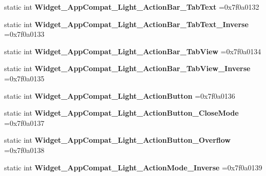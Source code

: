 \begin{DoxyCompactItemize}
static int {\bfseries Widget\+\_\+\+App\+Compat\+\_\+\+Light\+\_\+\+Action\+Bar\+\_\+\+Tab\+Text} =0x7f0a0132
\item 
\mbox{\label{classandroid_1_1support_1_1v4_1_1R_1_1style_aaf4b76b828460b4d14c966f7888f49d9}} 
static int {\bfseries Widget\+\_\+\+App\+Compat\+\_\+\+Light\+\_\+\+Action\+Bar\+\_\+\+Tab\+Text\+\_\+\+Inverse} =0x7f0a0133
\item 
\mbox{\label{classandroid_1_1support_1_1v4_1_1R_1_1style_a7fd9a696ea5c660f4b11408e3d6fc00d}} 
static int {\bfseries Widget\+\_\+\+App\+Compat\+\_\+\+Light\+\_\+\+Action\+Bar\+\_\+\+Tab\+View} =0x7f0a0134
\item 
\mbox{\label{classandroid_1_1support_1_1v4_1_1R_1_1style_aa3b5f71ae63d55d5da8e51136dacdff0}} 
static int {\bfseries Widget\+\_\+\+App\+Compat\+\_\+\+Light\+\_\+\+Action\+Bar\+\_\+\+Tab\+View\+\_\+\+Inverse} =0x7f0a0135
\item 
\mbox{\label{classandroid_1_1support_1_1v4_1_1R_1_1style_a83d68e87499011b6b95af61082e44988}} 
static int {\bfseries Widget\+\_\+\+App\+Compat\+\_\+\+Light\+\_\+\+Action\+Button} =0x7f0a0136
\item 
\mbox{\label{classandroid_1_1support_1_1v4_1_1R_1_1style_a0b990964682b267e3fd91dd641c4aa28}} 
static int {\bfseries Widget\+\_\+\+App\+Compat\+\_\+\+Light\+\_\+\+Action\+Button\+\_\+\+Close\+Mode} =0x7f0a0137
\item 
\mbox{\label{classandroid_1_1support_1_1v4_1_1R_1_1style_a6e001a81b16ee96d92ba8f69f5f3ed8e}} 
static int {\bfseries Widget\+\_\+\+App\+Compat\+\_\+\+Light\+\_\+\+Action\+Button\+\_\+\+Overflow} =0x7f0a0138
\item 
\mbox{\label{classandroid_1_1support_1_1v4_1_1R_1_1style_a474da9d7bc8c2dbca8ce615a7849c528}} 
static int {\bfseries Widget\+\_\+\+App\+Compat\+\_\+\+Light\+\_\+\+Action\+Mode\+\_\+\+Inverse} =0x7f0a0139
\item 
\mbox{\label{classandroid_1_1support_1_1v4_1_1R_1_1style_a0c13c26c45f5fa7e9beb58eb3d5c5a35}} 

\end{DoxyCompactItemize}
